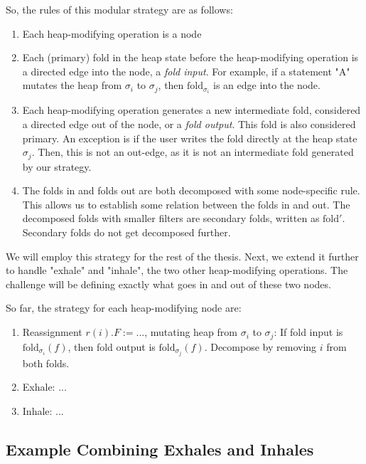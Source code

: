 \documentclass[msc,oneside]{ubcthesis}
\theoremstyle{definition}
\begin{document}
So, the rules of this modular strategy are as follows:
\begin{enumerate}
    \item Each heap-modifying operation is a node
    \item Each (primary) fold in the heap state before the heap-modifying operation is a directed edge into the node, a  \emph{fold input}. For example, if a statement "A" mutates the heap from $\sigma_i$ to $\sigma_j$, then $\textrm{fold}_{\sigma_i}$ is an edge into the node.
    \item Each heap-modifying operation generates a new intermediate fold, considered a directed edge out of the node, or a \emph{fold output}. This fold is also considered primary. An exception is if the user writes the fold directly at the heap state $\sigma_j$. Then, this is not an out-edge, as it is not an intermediate fold generated by our strategy.
    \item The folds in and folds out are both decomposed with some node-specific rule. This allows us to establish some relation between the folds in and out. The decomposed folds with smaller filters are secondary folds, written as $\textrm{fold}'$. Secondary folds do not get decomposed further.
\end{enumerate}

We will employ this strategy for the rest of the thesis. Next, we extend it further to handle "exhale" and "inhale", the two other heap-modifying operations. The challenge will be defining exactly what goes in and out of these two nodes.

So far, the strategy for each heap-modifying node are:
\begin{enumerate}
    \item Reassignment $r(i).F := ...$, mutating heap from $\sigma_i$ to $\sigma_j$: 
    If fold input is $\textrm{fold}_{\sigma_i}(f)$, then fold output is $\textrm{fold}_{\sigma_j}(f)$. 
    Decompose by removing $i$ from both folds.
    \item Exhale: ...
    \item Inhale: ...
\end{enumerate}

\subsection{Example Combining Exhales and Inhales}
\end{document}
